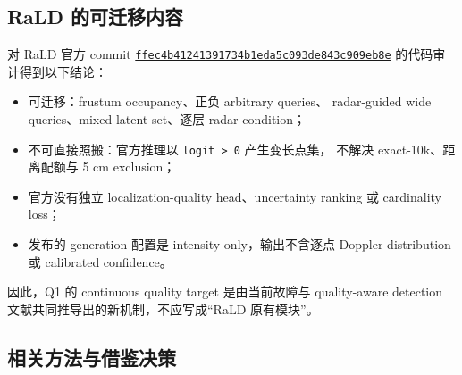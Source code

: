 \documentclass[11pt,a4paper,fontset=none]{ctexart}
\newcommand{\code}[1]{\texttt{#1}}
\begin{document}
\subsection{RaLD 的可迁移内容}

对 RaLD 官方 commit
\href{https://github.com/MetaIoT-WHU/RaLD/tree/ffec4b41241391734b1eda5c093de843c909eb8e}
{\code{ffec4b41241391734b1eda5c093de843c909eb8e}}
的代码审计得到以下结论：
\begin{itemize}
  \item 可迁移：frustum occupancy、正负 arbitrary queries、
  radar-guided wide queries、mixed latent set、逐层 radar condition；
  \item 不可直接照搬：官方推理以 \code{logit > 0} 产生变长点集，
  不解决 exact-10k、距离配额与 5 cm exclusion；
  \item 官方没有独立 localization-quality head、uncertainty ranking
  或 cardinality loss；
  \item 发布的 generation 配置是 intensity-only，输出不含逐点
  Doppler distribution 或 calibrated confidence。
\end{itemize}

因此，Q1 的 continuous quality target 是由当前故障与 quality-aware
detection 文献共同推导出的新机制，不应写成“RaLD 原有模块”。

\subsection{相关方法与借鉴决策}
\end{document}
